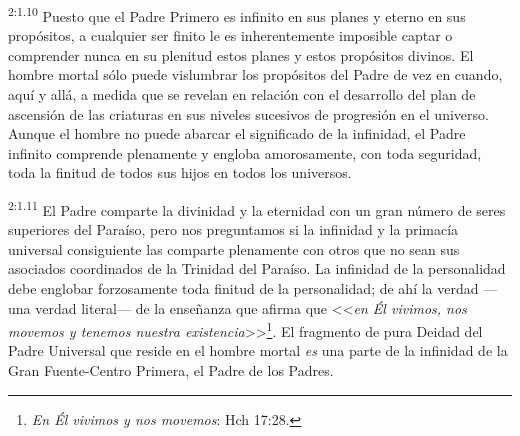 \par
\textsuperscript{2:1.10} Puesto que el Padre Primero es infinito en sus planes y eterno en sus propósitos, a cualquier ser finito le es inherentemente imposible captar o comprender nunca en su plenitud estos planes y estos propósitos divinos. El hombre mortal sólo puede vislumbrar los propósitos del Padre de vez en cuando, aquí y allá, a medida que se revelan en relación con el desarrollo del plan de ascensión de las criaturas en sus niveles sucesivos de progresión en el universo. Aunque el hombre no puede abarcar el significado de la infinidad, el Padre infinito comprende plenamente y engloba amorosamente, con toda seguridad, toda la finitud de todos sus hijos en todos los universos.

\par
\textsuperscript{2:1.11} El Padre comparte la divinidad y la eternidad con un gran número de seres superiores del Paraíso, pero nos preguntamos si la infinidad y la primacía universal consiguiente las comparte plenamente con otros que no sean sus asociados coordinados de la Trinidad del Paraíso. La infinidad de la personalidad debe englobar forzosamente toda finitud de la personalidad; de ahí la verdad ---una verdad literal--- de la enseñanza que afirma que <<\textit{en Él vivimos, nos movemos y tenemos nuestra existencia}>>\footnote{\textit{En Él vivimos y nos movemos}: Hch 17:28.}. El fragmento de pura Deidad del Padre Universal que reside en el hombre mortal \textit{es} una parte de la infinidad de la Gran Fuente-Centro Primera, el Padre de los Padres.

